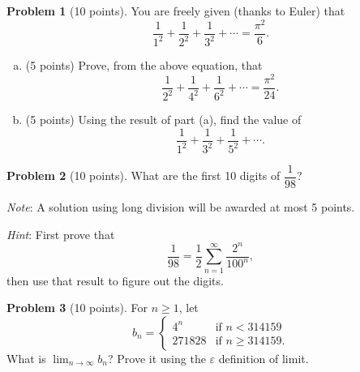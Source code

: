 \documentclass[11pt,oneside]{amsart}
\theoremstyle{definition}
\newtheorem{problem}{Problem}
\newcommand{\eps}{\varepsilon}
\begin{document}
\newpage

\begin{problem}[10 points]
You are freely given (thanks to Euler) that
\[\frac 1{1^2}+\frac 1{2^2}+\frac 1{3^2}+\cdots=\frac{\pi^2}6.\]
\begin{enumerate}[(a)]
  \item (5 points) Prove, from the above equation, that
        \[\frac 1{2^2}+\frac 1{4^2}+\frac 1{6^2}+\cdots=\frac{\pi^2}{24}.\]
        \vfill
  \item (5 points) Using the result of part (a), find the value of
        \[\frac 1{1^2}+\frac 1{3^2}+\frac 1{5^2}+\cdots.\]
        \vfill
\end{enumerate}
\end{problem}

\newpage




\begin{problem}[10 points]
What are the first 10 digits of $\dfrac 1{98}$?

\emph{Note}: A solution using long division will be awarded at most 5 points.

\emph{Hint}: First prove that
\[\frac 1{98}=\frac12 \sum_{n=1}^\infty \frac {2^n}{100^n},\]
then use that result to figure out the digits.
\end{problem}

\newpage

\begin{problem}[10 points]
For $n\geq 1$, let
\[b_n=\begin{cases}
    4^n    & \text{if }n<314159      \\
    271828 & \text{if }n\geq 314159.
  \end{cases}\]
What is $\lim_{n\to\infty}b_n$? Prove it using the $\eps$ definition of limit.
\end{problem}
\end{document}
